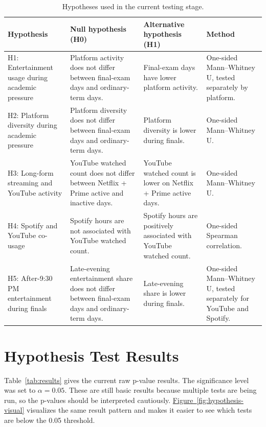 \documentclass[11pt,a4paper]{article}
\newcommand{\figref}[1]{\hyperref[#1]{Figure~\ref*{#1}}}
\begin{document}
\begin{table}[H]
\centering
\scriptsize
\caption{Hypotheses used in the current testing stage.}
\label{tab:hypotheses}
\begin{tabularx}{\textwidth}{p{} X X p{}}
\toprule
\textbf{Hypothesis} & \textbf{Null hypothesis (H0)} & \textbf{Alternative hypothesis (H1)} & \textbf{Method}\\
\midrule
H1: Entertainment usage during academic pressure & Platform activity does not differ between final-exam days and ordinary-term days. & Final-exam days have lower platform activity. & One-sided Mann--Whitney U, tested separately by platform.\\
H2: Platform diversity during academic pressure & Platform diversity does not differ between final-exam days and ordinary-term days. & Platform diversity is lower during finals. & One-sided Mann--Whitney U.\\
H3: Long-form streaming and YouTube activity & YouTube watched count does not differ between Netflix + Prime active and inactive days. & YouTube watched count is lower on Netflix + Prime active days. & One-sided Mann--Whitney U.\\
H4: Spotify and YouTube co-usage & Spotify hours are not associated with YouTube watched count. & Spotify hours are positively associated with YouTube watched count. & One-sided Spearman correlation.\\
H5: After-9:30 PM entertainment during finals & Late-evening entertainment share does not differ between final-exam days and ordinary-term days. & Late-evening share is lower during finals. & One-sided Mann--Whitney U, tested separately for YouTube and Spotify.\\
\bottomrule
\end{tabularx}
\end{table}

\section*{Hypothesis Test Results}
Table~\ref{tab:results} gives the current raw p-value results. The significance level was set to $\alpha=0.05$. These are still basic results because multiple tests are being run, so the p-values should be interpreted cautiously. \figref{fig:hypothesis-visual} visualizes the same result pattern and makes it easier to see which tests are below the 0.05 threshold.
\end{document}
